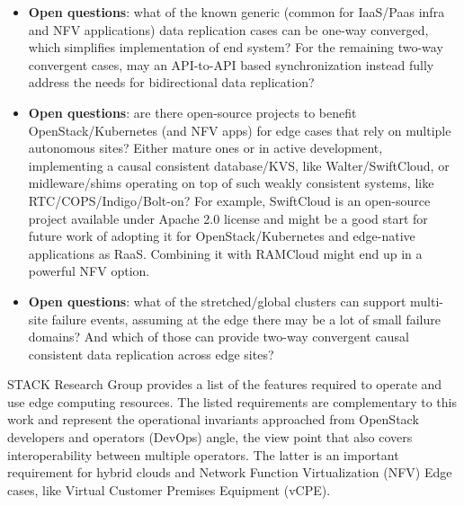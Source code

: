 \documentclass[conference]{IEEEtran}
\begin{document}
\begin{itemize}
  \item \textbf{Open questions}: what of the known generic (common for
    IaaS/Paas infra and NFV applications) data replication cases can be one-way
    converged, which simplifies implementation of end system? For the remaining
    two-way convergent cases, may an API-to-API based synchronization instead
    fully address the needs for bidirectional data replication?
  \item \textbf{Open questions}: are there open-source projects to benefit
    OpenStack/Kubernetes (and NFV apps) for edge cases that rely on multiple
    autonomous sites? Either mature ones or in active development,
    implementing a causal consistent database/KVS, like Walter/SwiftCloud, or
    midleware/shims operating on top of such weakly consistent systems, like
    RTC/COPS/Indigo/Bolt-on? For example, SwiftCloud is an open-source project
    available under Apache 2.0 license and might be a good start for future
    work of adopting it for OpenStack/Kubernetes and edge-native applications
    as RaaS. Combining it with RAMCloud might end up in a powerful NFV option.
  \item \textbf{Open questions}: what of the stretched/global clusters can
    support multi-site failure events, assuming at the edge there may be a lot
    of small failure domains? And which of those can provide two-way
    convergent causal consistent data replication across edge sites?
\end{itemize}

STACK Research Group\cite{b8} provides a list of the features required to
operate and use edge computing resources. The listed requirements are
complementary to this work and represent the operational invariants approached
from OpenStack developers and operators (DevOps) angle, the view point that
also covers interoperability between multiple operators. The latter is an
important requirement for hybrid clouds and Network Function Virtualization
(NFV) Edge cases, like Virtual Customer Premises Equipment (vCPE).
\end{document}

